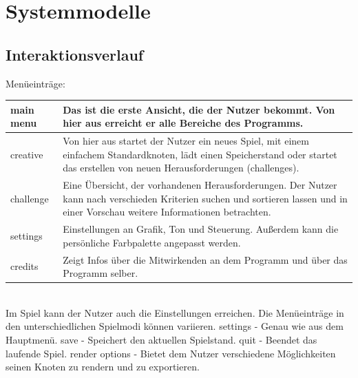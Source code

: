 \chapter{Systemmodelle}


\section{Interaktionsverlauf}

Menüeinträge:

\begin{longtable}{|p{}|p{}|}
    \hline
    main menu & Das ist die erste Ansicht, die der Nutzer bekommt. Von hier aus erreicht er alle Bereiche des Programms.\\
    
    \hline
    
    creative & Von hier aus startet der Nutzer ein neues Spiel, mit einem einfachem Standardknoten, lädt einen Speicherstand oder startet das erstellen von neuen Herausforderungen (challenges).\\
    
    \hline
    
    challenge & Eine Übersicht, der vorhandenen Herausforderungen. Der Nutzer kann nach verschieden Kriterien suchen und sortieren lassen und in einer Vorschau weitere Informationen betrachten.\\

    \hline
    
    settings & Einstellungen an Grafik, Ton und Steuerung. Außerdem kann die persönliche Farbpalette angepasst werden.\\

    \hline
    
    credits & Zeigt Infos über die Mitwirkenden an dem Programm und über das Programm selber.\\

    \hline
    
   \end{longtable}
    
	\begin{figure}[h]
	  \centering
	  
	\end{figure}
	~\\
	Im Spiel kann der Nutzer auch die {\color{red} Einstellungen} erreichen. Die Menüeinträge in den unterschiedlichen Spielmodi können variieren.
	settings - Genau wie aus dem Hauptmenü.
	save - Speichert den aktuellen Spielstand.
	quit - Beendet das laufende Spiel.
	render options - Bietet dem Nutzer verschiedene Möglichkeiten seinen Knoten zu rendern und zu exportieren.
    \begin{figure}[htbp]
	  \centering
	  
	\end{figure}


